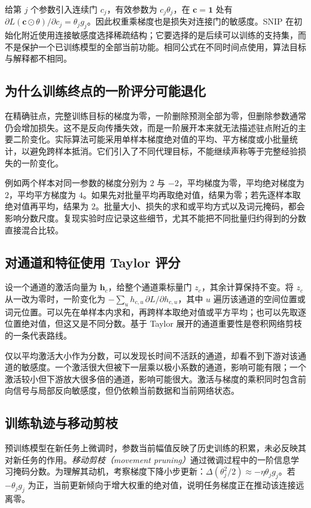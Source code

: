 \documentclass[UTF8,12pt,a4paper,fontset=fandol]{ctexart}
\begin{document}
给第 $j$ 个参数引入连续门 $c_j$，有效参数为 $c_j\theta_j$，在 $\mathbf c=\mathbf 1$ 处有 $\partial L(\mathbf c\odot\theta)/\partial c_j=\theta_jg_j$。因此权重乘梯度也是损失对连接门的敏感度。SNIP 在初始化附近使用连接敏感度选择稀疏结构\cite{lee2019}；它要选择的是后续可以训练的支持集，而不是保护一个已训练模型的全部当前功能。相同公式在不同时间点使用，算法目标与解释都不相同。

\subsection{为什么训练终点的一阶评分可能退化}
在精确驻点，完整训练目标的梯度为零，一阶删除预测全部为零，但删除参数通常仍会增加损失。这不是反向传播失效，而是一阶展开本来就无法描述驻点附近的主要二阶变化。实际算法可能采用单样本梯度绝对值的平均、平方梯度或小批量统计，以避免跨样本抵消。它们引入了不同代理目标，不能继续声称等于完整经验损失的一阶变化。

例如两个样本对同一参数的梯度分别为 $2$ 与 $-2$，平均梯度为零，平均绝对梯度为 $2$，平均平方梯度为 $4$。如果先对批量平均再取绝对值，结果为零；若先逐样本取绝对值再平均，结果为 $2$。批量大小、损失的求和或平均方式以及词元掩码，都会影响分数尺度。复现实验时应记录这些细节，尤其不能把不同批量归约得到的分数直接混合比较。

\subsection{对通道和特征使用 Taylor 评分}
设一个通道的激活向量为 $\mathbf h_c$，给整个通道乘标量门 $z_c$，其余计算保持不变。将 $z_c$ 从一改为零时，一阶变化为 $-\sum_u h_{c,u}\,\partial L/\partial h_{c,u}$，其中 $u$ 遍历该通道的空间位置或词元位置。可以先在单样本内求和，再跨样本取绝对值或平方平均；也可以先取逐位置绝对值，但这又是不同分数。基于 Taylor 展开的通道重要性是卷积网络剪枝的一条代表路线\cite{molchanov2017}。

仅以平均激活大小作为分数，可以发现长时间不活跃的通道，却看不到下游对该通道的敏感度。一个激活很大但被下一层乘以极小系数的通道，影响可能有限；一个激活较小但下游放大很多倍的通道，影响可能很大。激活与梯度的乘积同时包含前向信号与局部反向敏感度，但仍依赖当前数据和当前网络状态。

\subsection{训练轨迹与移动剪枝}
预训练模型在新任务上微调时，参数当前幅值反映了历史训练的积累，未必反映其对新任务的作用。\emph{移动剪枝（movement pruning）}通过微调过程中的一阶信息学习掩码分数\cite{sanh2020}。为理解其动机，考察梯度下降小步更新：$\Delta(\theta_j^2/2)\approx-\eta\theta_jg_j$。若 $-\theta_jg_j$ 为正，当前更新倾向于增大权重的绝对值，说明任务梯度正在推动该连接远离零。
\end{document}
